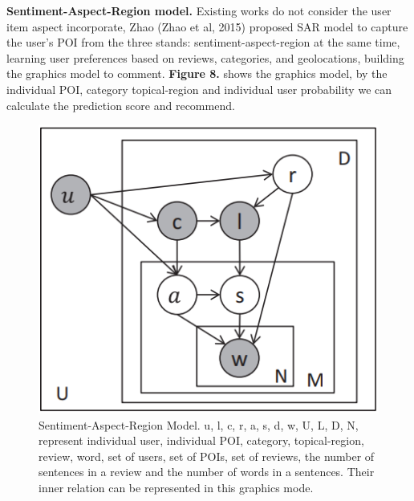 \documentclass[10pt,twocolumn,letterpaper]{article}
\begin{document}
{\bf Sentiment-Aspect-Region model.} Existing works do not consider the user item aspect incorporate, Zhao (Zhao et al, 2015) proposed SAR model to capture the user's POI from the three stands: sentiment-aspect-region at the same time, learning user preferences based on reviews, categories, and geolocations, building the graphics model to comment. {\bf Figure 8.} shows the graphics model, by the individual POI, category topical-region and individual user probability we can calculate the prediction score and recommend.   
\begin{figure}
	\begin{center}
		\includegraphics[width=0.8\linewidth]{SAR.png}
	\end{center}
	\caption{Sentiment-Aspect-Region Model. u, l, c, r, a, s, d, w, U, L, D, N, represent individual user, individual POI, category, topical-region, review, word, set of users, set of POIs, set of reviews, the number of sentences in a review and the number of words in a sentences. Their inner relation can be represented in this graphics mode.}
	\label{fig:long}
	\label{fig:onecol}
\end{figure}
\end{document}
